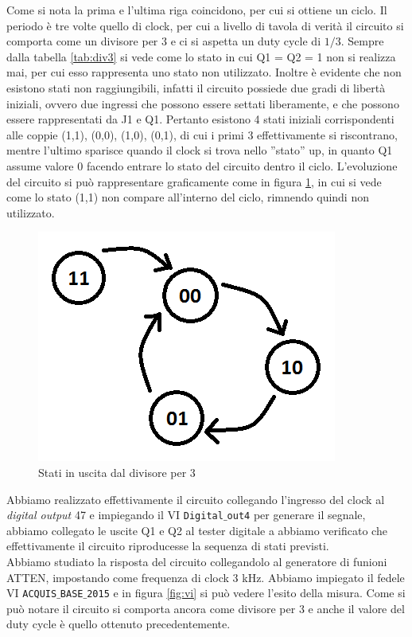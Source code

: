 \documentclass[journal, a4paper]{IEEEtran}
\begin{document}
Come si nota la prima e l'ultima riga coincidono, per cui si ottiene un ciclo. Il periodo è tre volte quello di clock, per cui a livello di tavola di verità il circuito si comporta come un divisore per 3 e ci si aspetta un duty cycle di $1/3$. Sempre dalla tabella \ref{tab:div3} si vede come lo  stato in cui Q1 = Q2 = 1 non si realizza mai, per cui esso rappresenta uno stato non utilizzato. Inoltre è evidente che non esistono stati non raggiungibili, infatti il circuito possiede due gradi di libertà iniziali, ovvero due ingressi che possono essere settati liberamente, e che possono essere rappresentati da J1 e Q1. Pertanto esistono 4 stati iniziali corrispondenti alle coppie (1,1), (0,0), (1,0), (0,1), di cui i primi 3 effettivamente si riscontrano, mentre l'ultimo sparisce quando il clock si trova nello ''stato'' up, in quanto Q1 assume valore 0 facendo entrare lo stato del circuito dentro il ciclo. L'evoluzione del circuito si può rappresentare graficamente come in figura \ref{fig:graph}, in cui si vede come lo stato (1,1) non compare all'interno del ciclo, rimnendo quindi non utilizzato.\\

\begin{figure}[htp]
\centering
\includegraphics[scale=.5]{Immagine}
\caption{Stati in uscita dal divisore per 3}
\label{fig:graph}
\end{figure}

Abbiamo realizzato effettivamente il circuito collegando l'ingresso del clock al \emph{digital output} 47 e impiegando il VI \texttt{Digital$\_$out4} per generare il segnale, abbiamo collegato le uscite Q1 e Q2 al tester digitale a abbiamo verificato che effettivamente il circuito riproducesse la sequenza di stati previsti.\\
Abbiamo studiato la risposta del circuito collegandolo al generatore di funioni ATTEN, impostando come frequenza di clock 3 kHz. Abbiamo impiegato il fedele VI \texttt{ACQUIS$\_$BASE$\_$2015} e in figura \ref{fig:vi} si può vedere l'esito della misura. Come si può notare il circuito si comporta ancora come divisore per 3 e anche il valore del duty cycle è quello ottenuto precedentemente.
\end{document}
